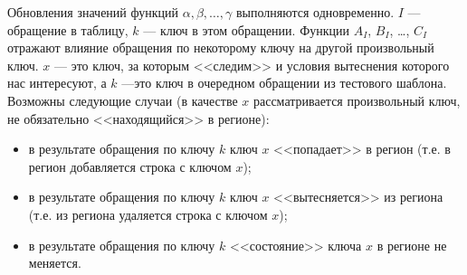 \begin{enumerate}
Обновления значений функций $\alpha, \beta, \dots, \gamma$ выполняются одновременно. $I$ --- обращение в таблицу, $k$ --- ключ в этом обращении. Функции $A_I$, $B_I$, \dots, $C_I$ отражают влияние обращения по некоторому ключу на другой произвольный ключ. $x$ --- это ключ, за которым <<следим>> и условия вытеснения которого нас интересуют, а $k$ ---это ключ в очередном обращении из тестового шаблона.
Возможны следующие случаи (в качестве $x$ рассматривается произвольный ключ, не
обязательно <<находящийся>> в регионе):
\begin{itemize}
    \item в результате обращения по ключу $k$ ключ $x$ <<попадает>> в регион (т.е. в регион добавляется строка с ключом $x$);
    \item в результате обращения по ключу $k$ ключ $x$ <<вытесняется>> из региона (т.е. из региона удаляется строка с ключом $x$);
    \item в результате обращения по ключу $k$ <<состояние>> ключа $x$ в регионе не меняется.
\end{itemize}



\end{enumerate}
